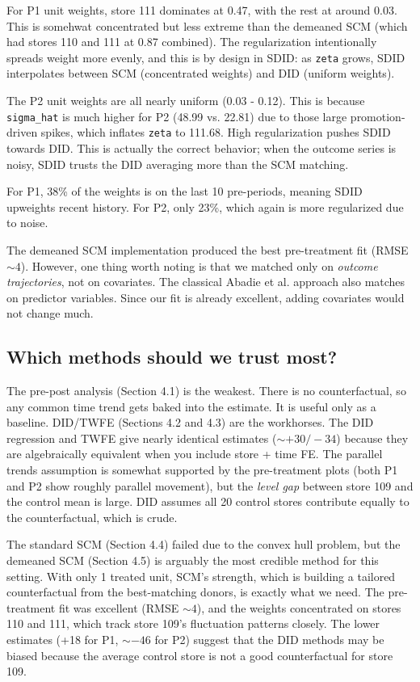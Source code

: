 \documentclass[10pt]{article}
\begin{document}
For P1 unit weights, store 111 dominates at 0.47, with the rest at around 0.03. This is somehwat concentrated but less extreme than the demeaned SCM (which had stores 110 and 111 at 0.87 combined). The regularization intentionally spreads weight more evenly, and this is by design in SDID: as \verb|zeta| grows, SDID interpolates between SCM (concentrated weights) and DID (uniform weights). 

The P2 unit weights are all nearly uniform (0.03 - 0.12). This is because \verb|sigma_hat| is much higher for P2 (48.99 vs. 22.81) due to those large promotion-driven spikes, which inflates \verb|zeta| to 111.68. High regularization pushes SDID towards DID. This is actually the correct behavior; when the outcome series is noisy, SDID trusts the DID averaging more than the SCM matching. 

For P1, 38\% of the weights is on the last 10 pre-periods, meaning SDID upweights recent history. For P2, only 23\%, which again is more regularized due to noise.

The demeaned SCM implementation produced the best pre-treatment fit (RMSE $\sim 4 $). However, one thing worth noting is that we matched only on \textit{outcome trajectories}, not on covariates. The classical Abadie et al. approach also matches on predictor variables. Since our fit is already excellent, adding covariates would not change much. 

\subsection{Which methods should we trust most?}

The pre-post analysis (Section 4.1) is the weakest. There is no counterfactual, so any common time trend gets baked into the estimate. It is useful only as a baseline. DID/TWFE (Sections 4.2 and 4.3) are the workhorses. The DID regression and TWFE give nearly identical estimates ($\sim +30 / -34$) because they are algebraically equivalent when you include store + time FE. The parallel trends assumption is somewhat supported by the pre-treatment plots (both P1 and P2 show roughly parallel movement), but the \textit{level gap} between store 109 and the control mean is large. DID assumes all 20 control stores contribute equally to the counterfactual, which is crude. 

The standard SCM (Section 4.4) failed due to the convex hull problem, but the demeaned SCM (Section 4.5) is arguably the most credible method for this setting. With only 1 treated unit, SCM's strength, which is building a tailored counterfactual from the best-matching donors, is exactly what we need. The pre-treatment fit was excellent (RMSE $\sim 4$), and the weights concentrated on stores 110 and 111, which track store 109's fluctuation patterns closely. The lower estimates (+18 for P1, $\sim -46$ for P2) suggest that the DID methods may be biased because the average control store is not a good counterfactual for store 109. 
\end{document}
